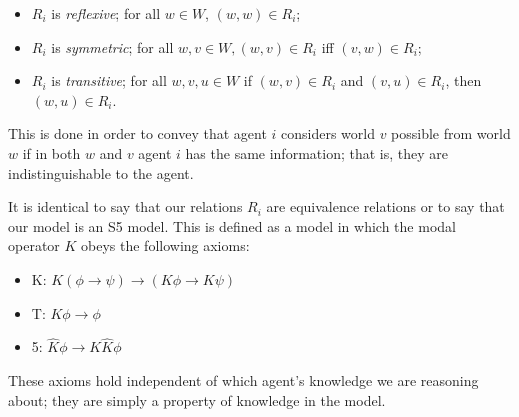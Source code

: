 \documentclass[ %
                    author={Leo Poulson},
                supervisor={Dr. Steven Ramsay},
                    degree={BSc},
                     title={Epistemic Planning for the Dynamic Gossip problem},
                  subtitle={},
                      year={2019} ]{dissertation}
\begin{document}
\begin{itemize}
\item $R_i$ is \emph{reflexive}; for all $w \in W$, $(w, w) \in R_i$;
\item $R_i$ is \emph{symmetric}; for all $w, v \in W, (w, v) \in R_i$ iff $(v,
  w) \in R_i$;
\item $R_i$ is \emph{transitive}; for all $w, v, u \in W$ if $(w, v) \in R_i$
  and $(v, u) \in R_i$, then $(w, u) \in R_i$.
\end{itemize}

This is done in order to convey that agent $i$ considers world $v$ possible from
world $w$ if in both $w$ and $v$ agent $i$ has the same information; that is,
they are indistinguishable to the agent.

It is identical to say that our relations $R_i$ are equivalence relations or to
say that our model is an \textsf{S5} model. This is defined as a model in which
the modal operator $K$ obeys the following axioms:

\begin{itemize}
\item \textsf{K}: $K (\phi \rightarrow \psi) \rightarrow (K \phi \rightarrow K
  \psi)$
\item \textsf{T}: $K \phi \rightarrow \phi$
\item \textsf{5}: $\widehat K \phi \rightarrow K \widehat K \phi$
\end{itemize}

These axioms hold independent of which agent's knowledge we are reasoning about;
they are simply a property of knowledge in the model. 

\begin{figure}[h]
  \centering
  \caption{}
  \label{fig:EgS5}
\end{figure}
\end{document}
